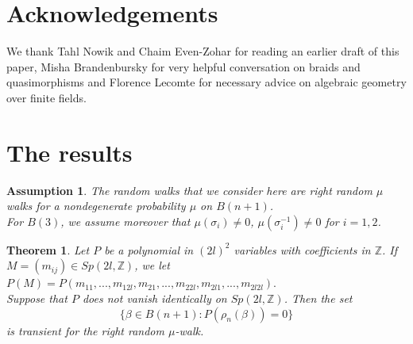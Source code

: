 \documentclass[10pt,a4paper]{amsart}
\newtheorem{thm}{Theorem}
\newtheorem{ass}{Assumption}
\begin{document}
\section*{Acknowledgements}
We thank Tahl Nowik and Chaim Even-Zohar for reading an earlier draft of this paper, Misha Brandenbursky for very helpful conversation on braids and quasimorphisms and Florence Lecomte for necessary advice on algebraic geometry over finite fields. 


\section{The results}
\begin{ass}\label{assump}  The random walks that we consider here are right random $\mu$ walks for a nondegenerate probability $\mu$ on $B(n+1)$. \\
For $B(3)$, we assume moreover that $\mu(\sigma_i)\neq 0$, $\mu(\sigma_i^{-1})\neq 0$ for $i=1,2$.
\end{ass}

\begin{thm}\label{prop sur les transients}
	Let $P$ be a polynomial in $(2l)^2$ variables with coefficients in $\mathbb{Z}$. If $M=(m_{ij})\in Sp(2l,\mathbb{Z})$, we let 
	$P(M)=P(m_{11},...,m_{12l},m_{21},...,m_{22l},m_{2l1},...,m_{2l2l}).$\\
	Suppose that $P$ does not vanish identically on $Sp(2l,\mathbb{Z})$. Then the set
	$$\{\beta\in B(n+1): P(\rho_n(\beta))=0\}$$
	is transient for the right random $\mu$-walk.
\end{thm}

\setcounter{thm}{5}
\end{document}
